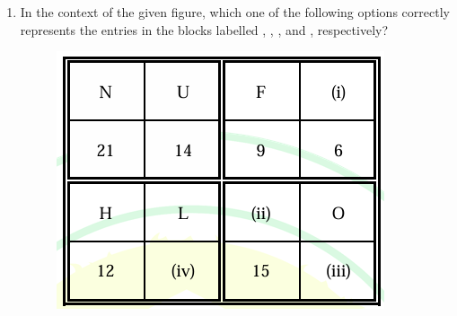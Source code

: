 \documentclass[journal]{IEEEtran}
\begin{document}
\begin{enumerate}
    \hfill{}

    \begin{enumerate}
    \end{enumerate}

    \item In the context of the given figure, which one of the following options correctly represents the entries in the blocks labelled , , , and , respectively?

    \begin{figure}[H]
        \centering
        \includegraphics[width=0.8\columnwidth]{figs/q4.png}
        \caption*{}
        \label{fig:q4}
    \end{figure}

    \hfill{}

    \begin{enumerate}
    \end{enumerate}


\end{enumerate}
\end{document}
